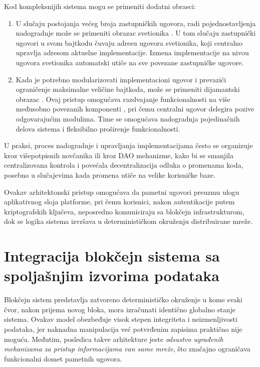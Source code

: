 Kod kompleksnijih sistema mogu se primeniti dodatni obrasci:
\begin{enumerate}
\item U slučaju postojanja većeg broja zastupničkih ugovora, radi pojednostavljenja nadogradnje može se primeniti obrazac svetionika . U tom slučaju zastupnički ugovori u svom bajtkodu čuvaju adresu ugovora svetionika, koji centralno upravlja adresom aktuelne implementacije. Izmena implementacije na nivou ugovora svetionika automatski utiče na sve povezane zastupničke ugovore.

\item Kada je potrebno modularizovati implementacioni ugovor i prevazići ograničenje maksimalne veličine bajtkoda, može se primeniti dijamantski obrazac \cite{DIAMONDeip2535} . Ovaj pristup omogućava razdvajanje funkcionalnosti na više međusobno povezanih komponenti , pri čemu centralni ugovor  delegira pozive odgovarajućim modulima. Time se omogućava nadogradnja pojedinačnih delova sistema i fleksibilno proširenje funkcionalnosti.
\end{enumerate}

U praksi, proces nadogradnje i upravljanja implementacijama često se organizuje kroz višepotpisnih novčanika ili kroz DAO mehanizme, kako bi se smanjila centralizovana kontrola i povećala decentralizacija odluka o promenama koda, posebno u slučajevima kada promena utiče na velike korisničke baze.

Ovakav arhitektonski pristup omogućava da pametni ugovori preuzmu ulogu aplikativnog sloja platforme, pri čemu korisnici, nakon autentikacije putem kriptografskih ključeva, neposredno komuniciraju sa blokčejn infrastrukturom, dok se logika sistema izvršava u determinističkom okruženju distribuirane mreže.

\section{Integracija blokčejn sistema sa spoljašnjim izvorima podataka}
Blokčejn sistem predstavlja zatvoreno determinističko okruženje u kome svaki čvor, nakon prijema novog bloka, mora izračunati identično globalno stanje sistema. Ovakav model obezbeđuje visok stepen integriteta i neizmenljivosti podataka, jer naknadna manipulacija već potvrđenim zapisima praktično nije moguća. Međutim, posledica takve arhitekture jeste \textit{odsustvo ugrađenih mehanizama za pristup informacijama van same mreže}, što značajno ograničava funkcionalni domet pametnih ugovora.

